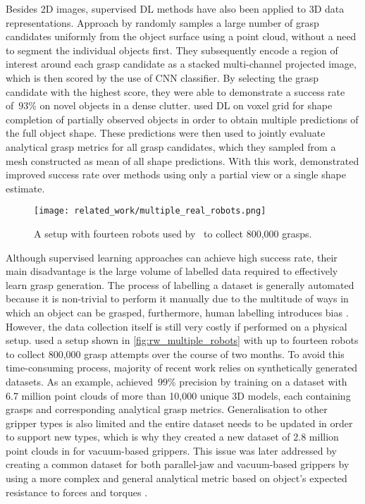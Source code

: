 Besides 2D images, supervised DL methods have also been applied to 3D data representations. Approach by \citet{ten_pas_grasp_2017} randomly samples a large number of grasp candidates uniformly from the object surface using a point cloud, without a need to segment the individual objects first. They subsequently encode a region of interest around each grasp candidate as a stacked multi-channel projected image, which is then scored by the use of CNN classifier. By selecting the grasp candidate with the highest score, they were able to demonstrate a success rate of~\(93\)\% on novel objects in a dense clutter. \citet{lundell_robust_2019} used DL on voxel grid for shape completion of partially observed objects in order to obtain multiple predictions of the full object shape. These predictions were then used to jointly evaluate analytical grasp metrics for all grasp candidates, which they sampled from a mesh constructed as mean of all shape predictions. With this work, \citeauthor{lundell_robust_2019} demonstrated improved success rate over methods using only a partial view or a single shape estimate.

\begin{figure}[b]
    \centering
    \texttt{[image: related\_work/multiple\_real\_robots.png]}
    \caption{A setup with fourteen robots used by~\protect\citet{levine_learning_2016} to collect 800,000 grasps.}
    \label{fig:rw_multiple_robots}
\end{figure}

Although supervised learning approaches can achieve high success rate, their main disadvantage is the large volume of labelled data required to effectively learn grasp generation. The process of labelling a dataset is generally automated because it is non-trivial to perform it manually due to the multitude of ways in which an object can be grasped, furthermore, human labelling introduces bias \cite{pinto_supersizing_2015}. However, the data collection itself is still very costly if performed on a physical setup. \citet{levine_learning_2016} used a setup shown in \autoref{fig:rw_multiple_robots} with up to fourteen robots to collect 800,000 grasp attempts over the course of two months. To avoid this time-consuming process, majority of recent work relies on synthetically generated datasets. As an example, \citet{mahler_dex-net_2017} achieved~\(99\)\% precision by training on a dataset with 6.7 million point clouds of more than 10,000 unique 3D models, each containing grasps and corresponding analytical grasp metrics. Generalisation to other gripper types is also limited and the entire dataset needs to be updated in order to support new types, which is why they created a new dataset of 2.8 million point clouds in \citeyear{mahler_dex-net_2018} for vacuum-based grippers. This issue was later addressed by creating a common dataset for both parallel-jaw and vacuum-based grippers by using a more complex and general analytical metric based on object's expected resistance to forces and torques \cite{mahler_learning_2019}.


